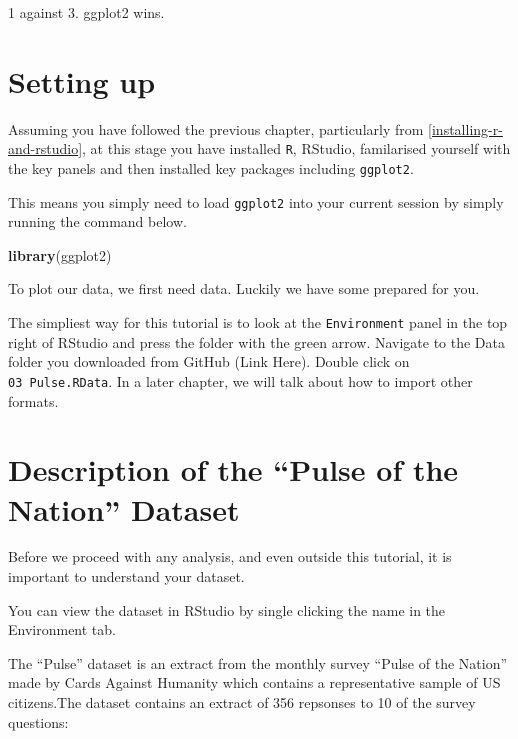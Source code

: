 \documentclass[]{book}
\newenvironment{Shaded}{\begin{snugshade}}{\end{snugshade}}
\newcommand{\KeywordTok}[1]{\textcolor[rgb]{0.13,0.29,0.53}{\textbf{#1}}}
\newcommand{\NormalTok}[1]{#1}
\begin{document}
1 against 3. ggplot2 wins.

\hypertarget{ggplot2_setting_up}{%
\section{Setting up}\label{ggplot2_setting_up}}

Assuming you have followed the previous chapter, particularly from \ref{installing-r-and-rstudio}, at this stage you have installed \texttt{R}, RStudio, familarised yourself with the key panels and then installed key packages including \texttt{ggplot2}.

This means you simply need to load \texttt{ggplot2} into your current session by simply running the command below.

\begin{Shaded}
\begin{Highlighting}[]
\KeywordTok{library}\NormalTok{(ggplot2)}
\end{Highlighting}
\end{Shaded}

To plot our data, we first need data. Luckily we have some prepared for you.

The simpliest way for this tutorial is to look at the \texttt{Environment} panel in the top right of RStudio and press the folder with the green arrow. Navigate to the Data folder you downloaded from GitHub (Link Here). Double click on \texttt{03\ Pulse.RData}. In a later chapter, we will talk about how to import other formats.

\hypertarget{description-of-the-pulse-of-the-nation-dataset}{%
\section{Description of the ``Pulse of the Nation'' Dataset}\label{description-of-the-pulse-of-the-nation-dataset}}

Before we proceed with any analysis, and even outside this tutorial, it is important to understand your dataset.

You can view the dataset in RStudio by single clicking the name in the Environment tab.

The ``Pulse'' dataset is an extract from the monthly survey ``Pulse of the Nation'' made by Cards Against Humanity \citep{pulse} which contains a representative sample of US citizens.The dataset contains an extract of 356 repsonses to 10 of the survey questions:
\end{document}
